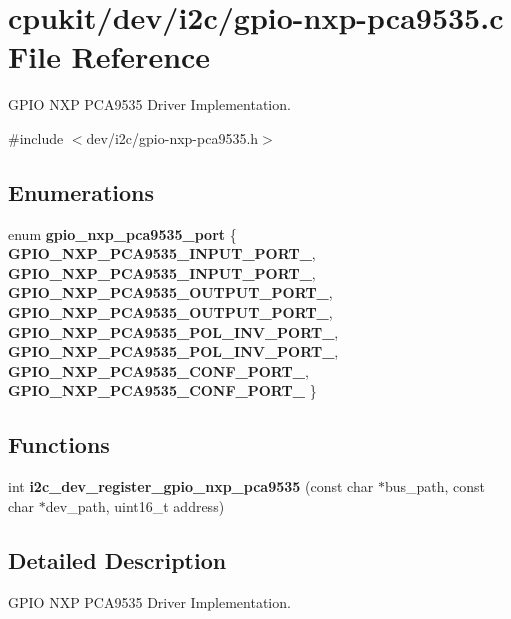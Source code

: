 \hypertarget{gpio-nxp-pca9535_8c}{}\section{cpukit/dev/i2c/gpio-\/nxp-\/pca9535.c File Reference}
\label{gpio-nxp-pca9535_8c}


G\+P\+IO N\+XP P\+C\+A9535 Driver Implementation.  


{\ttfamily \#include $<$dev/i2c/gpio-\/nxp-\/pca9535.\+h$>$}\newline
\subsection*{Enumerations}
\begin{DoxyCompactItemize}
\item 
\mbox{\label{gpio-nxp-pca9535_8c_a9e575ac5963cc2dad30a4eb1236424aa}} 
enum {\bfseries gpio\+\_\+nxp\+\_\+pca9535\+\_\+port} \{ \newline
{\bfseries G\+P\+I\+O\+\_\+\+N\+X\+P\+\_\+\+P\+C\+A9535\+\_\+\+I\+N\+P\+U\+T\+\_\+\+P\+O\+R\+T\+\_}, 
{\bfseries G\+P\+I\+O\+\_\+\+N\+X\+P\+\_\+\+P\+C\+A9535\+\_\+\+I\+N\+P\+U\+T\+\_\+\+P\+O\+R\+T\+\_}, 
{\bfseries G\+P\+I\+O\+\_\+\+N\+X\+P\+\_\+\+P\+C\+A9535\+\_\+\+O\+U\+T\+P\+U\+T\+\_\+\+P\+O\+R\+T\+\_}, 
{\bfseries G\+P\+I\+O\+\_\+\+N\+X\+P\+\_\+\+P\+C\+A9535\+\_\+\+O\+U\+T\+P\+U\+T\+\_\+\+P\+O\+R\+T\+\_}, 
\newline
{\bfseries G\+P\+I\+O\+\_\+\+N\+X\+P\+\_\+\+P\+C\+A9535\+\_\+\+P\+O\+L\+\_\+\+I\+N\+V\+\_\+\+P\+O\+R\+T\+\_}, 
{\bfseries G\+P\+I\+O\+\_\+\+N\+X\+P\+\_\+\+P\+C\+A9535\+\_\+\+P\+O\+L\+\_\+\+I\+N\+V\+\_\+\+P\+O\+R\+T\+\_}, 
{\bfseries G\+P\+I\+O\+\_\+\+N\+X\+P\+\_\+\+P\+C\+A9535\+\_\+\+C\+O\+N\+F\+\_\+\+P\+O\+R\+T\+\_}, 
{\bfseries G\+P\+I\+O\+\_\+\+N\+X\+P\+\_\+\+P\+C\+A9535\+\_\+\+C\+O\+N\+F\+\_\+\+P\+O\+R\+T\+\_}
 \}
\end{DoxyCompactItemize}
\subsection*{Functions}
\begin{DoxyCompactItemize}
\item 
int {\bfseries i2c\+\_\+dev\+\_\+register\+\_\+gpio\+\_\+nxp\+\_\+pca9535} (const char $\ast$bus\+\_\+path, const char $\ast$dev\+\_\+path, uint16\+\_\+t address)
\end{DoxyCompactItemize}


\subsection{Detailed Description}
G\+P\+IO N\+XP P\+C\+A9535 Driver Implementation. 


